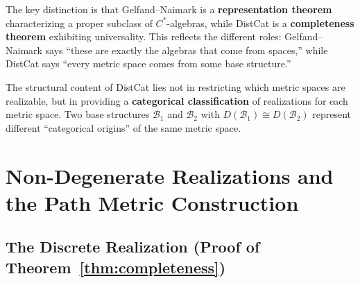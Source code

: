 \documentclass[11pt,a4paper]{article}
\begin{document}
The key distinction is that Gelfand--Naimark is a \textbf{representation
theorem} characterizing a proper subclass of $C^*$-algebras, while DistCat
is a \textbf{completeness theorem} exhibiting universality. This reflects
the different roles: Gelfand--Naimark says ``these are exactly the algebras
that come from spaces,'' while DistCat says ``every metric space comes from
some base structure.''

The structural content of DistCat lies not in restricting which metric spaces
are realizable, but in providing a \textbf{categorical classification} of
realizations for each metric space. Two base structures $\mathcal{B}_1$ and
$\mathcal{B}_2$ with $D(\mathcal{B}_1)\cong D(\mathcal{B}_2)$ represent
different ``categorical origins'' of the same metric space.

\section{Non-Degenerate Realizations and the Path Metric Construction}

\subsection{The Discrete Realization (Proof of Theorem~\ref{thm:completeness})}
\end{document}
